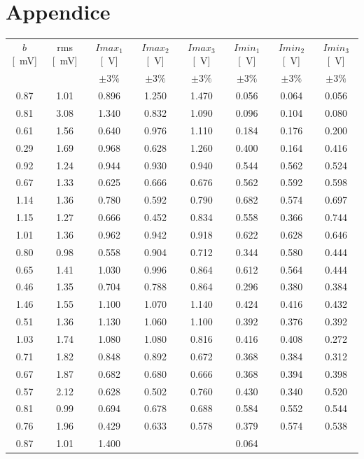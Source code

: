 \documentclass[10pt,oneside,a4paper]{article}
\begin{document}
\section{Appendice}
\begin{center}
\label{tab:Ac_differenziale}
\begin{tabular}{c|c|c|c|c|c|c|c}
$b$ [\SI{}{mV}] & rms [\SI{}{mV}] & $Imax_1$ [\SI{}{V}] & $Imax_2$ [\SI{}{V}] & $Imax_3$ [\SI{}{V}] &  $Imin_1$ [\SI{}{V}] & $Imin_2$ [\SI{}{V}] & $Imin_3$ [\SI{}{V}]  \\
  &   &  $\pm 3\%$ & $\pm 3\%$ & $\pm 3\%$ &  $\pm 3\%$ & $\pm 3\%$ & $\pm 3\%$ \\
\hline
 0.87 & 1.01 &  0.896 & 1.250 & 1.470 &  0.056 & 0.064 & 0.056 \\
 0.81 & 3.08 &  1.340 & 0.832 & 1.090 &  0.096 & 0.104 & 0.080 \\
 0.61 & 1.56 &  0.640 & 0.976 & 1.110 &  0.184 & 0.176 & 0.200 \\
 0.29 & 1.69 &  0.968 & 0.628 & 1.260 &  0.400 & 0.164 & 0.416 \\
 0.92 & 1.24 &  0.944 & 0.930 & 0.940 &  0.544 & 0.562 & 0.524 \\
 0.67 & 1.33 &  0.625 & 0.666 & 0.676 &  0.562 & 0.592 & 0.598 \\
 1.14 & 1.36 &  0.780 & 0.592 & 0.790 &  0.682 & 0.574 & 0.697 \\
 1.15 & 1.27 &  0.666 & 0.452 & 0.834 &  0.558 & 0.366 & 0.744 \\
 1.01 & 1.36 &  0.962 & 0.942 & 0.918 &  0.622 & 0.628 & 0.646 \\
 0.80 & 0.98 &  0.558 & 0.904 & 0.712 &  0.344 & 0.580 & 0.444 \\
 0.65 & 1.41 &  1.030 & 0.996 & 0.864 &  0.612 & 0.564 & 0.444 \\
 0.46 & 1.35 &  0.704 & 0.788 & 0.864 &  0.296 & 0.380 & 0.384 \\
 1.46 & 1.55 &  1.100 & 1.070 & 1.140 &  0.424 & 0.416 & 0.432 \\
 0.51 & 1.36 &  1.130 & 1.060 & 1.100 &  0.392 & 0.376 & 0.392 \\
 1.03 & 1.74 &  1.080 & 1.080 & 0.816 &  0.416 & 0.408 & 0.272 \\
 0.71 & 1.82 &  0.848 & 0.892 & 0.672 &  0.368 & 0.384 & 0.312 \\
 0.67 & 1.87 &  0.682 & 0.680 & 0.666 &  0.368 & 0.394 & 0.398 \\
 0.57 & 2.12 &  0.628 & 0.502 & 0.760 &  0.430 & 0.340 & 0.520 \\
 0.81 & 0.99 &  0.694 & 0.678 & 0.688 &  0.584 & 0.552 & 0.544 \\
 0.76 & 1.96 &  0.429 & 0.633 & 0.578 &  0.379 & 0.574 & 0.538 \\
 0.87 & 1.01 &  1.400 &	   &	        &  0.064 & 	 & 	\\
\hline
\end{tabular}
\end{center}
\end{document}
